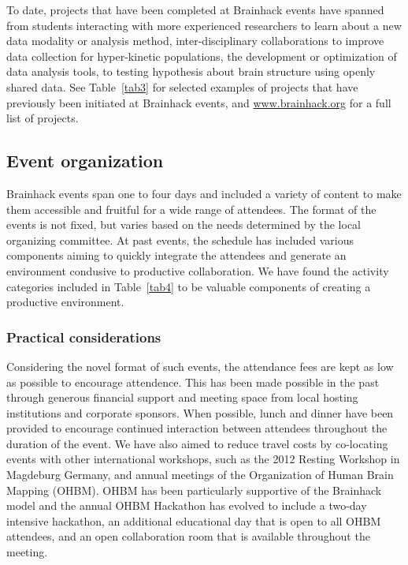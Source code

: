 \documentclass[11pt]{bmc_article_s50}
\begin{document}
To date, projects that have been completed at Brainhack events have spanned from students interacting with more experienced researchers to learn about a new data modality or analysis method, inter-disciplinary collaborations to improve data collection for hyper-kinetic populations, the development or optimization of data analysis tools, to testing hypothesis about brain structure using openly shared data. See Table~\ref{tab3} for selected examples of projects that have previously been initiated at Brainhack events, and \href{http://www.brainhack.org}{www.brainhack.org} for a full list of projects.

\subsection{Event organization}

Brainhack events span one to four days and included a variety of content to make them accessible and fruitful for a wide range of attendees. The format of the events is not fixed, but varies based on the needs determined by the local organizing committee. At past events, the schedule has included various components aiming to quickly integrate the attendees and generate an environment condusive to productive collaboration. We have found the activity categories included in Table~\ref{tab4} to be valuable components of creating a productive environment. 

\subsubsection{Practical considerations}

Considering the novel format of such events, the attendance fees are kept as low as possible to encourage attendence. This has been made possible in the past through generous financial support and meeting space from local hosting institutions and corporate sponsors. When possible, lunch and dinner have been provided to encourage continued interaction between attendees throughout the duration of the event. We have also aimed to reduce travel costs by co-locating events with other international workshops, such as the 2012 Resting Workshop in Magdeburg Germany, and annual meetings of the Organization of Human Brain Mapping (OHBM). OHBM has been particularly supportive of the Brainhack model and the annual OHBM Hackathon has evolved to include a two-day intensive hackathon, an additional educational day that is open to all OHBM attendees, and an open collaboration room that is available throughout the meeting.
\end{document}
